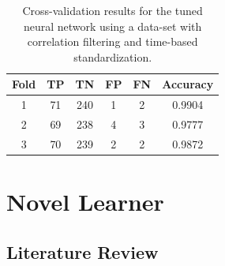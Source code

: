 \documentclass[paper=a4, fontsize=11pt]{scrartcl} %
\begin{document}
\begin{table}[H]
	\centering
	\caption{Cross-validation results for the tuned neural network using a data-set  with correlation filtering and time-based standardization.}
	\begin{tabular}{|c|c|c|c|c|c|}
		\hline
		\textbf{Fold} & \textbf{TP} & \textbf{TN} & \textbf{FP} & \textbf{FN} & \textbf{Accuracy} \\ \hline \hline
		1 & 71 & 240 & 1 & 2 & 0.9904  \\ \hline
		2 & 69 & 238 & 4 & 3 & 0.9777  \\ \hline
		3 & 70 & 239 & 2 & 2 & 0.9872  \\ \hline
	\end{tabular}
	\label{tab: cv_best_nn_filtered}
\end{table}

\section{Novel Learner} \label{sec: novel}

\subsection*{Literature Review} 
\end{document}
